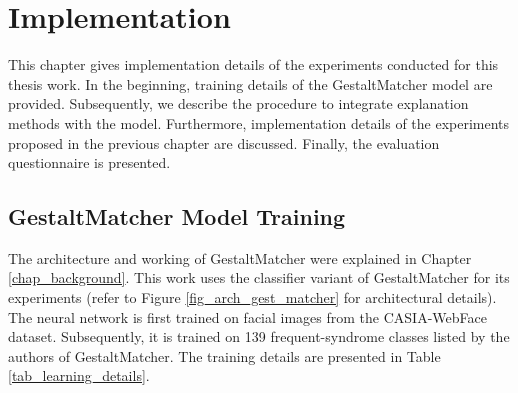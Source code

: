 \documentclass[../report.tex]{subfiles}
\begin{document}
    \chapter{Implementation}\label{ch_implementation}
    \noindent
    This chapter gives implementation details of the experiments conducted for this thesis work. In the beginning,  training details of the GestaltMatcher model are provided. Subsequently, we describe the procedure to integrate explanation methods with the model. Furthermore, implementation details of the experiments proposed in the previous chapter are discussed. Finally, the evaluation questionnaire is presented.
	\section{GestaltMatcher Model Training}
	    \noindent
	The architecture and working of GestaltMatcher were explained in Chapter \ref{chap_background}. This work uses the classifier variant of GestaltMatcher for its experiments (refer to Figure \ref{fig_arch_gest_matcher} for architectural details). The neural network is first trained on facial images from the CASIA-WebFace \cite{yi2014learning} dataset. Subsequently, it is trained on 139 frequent-syndrome classes listed by the authors of GestaltMatcher. The training details are presented in Table \ref{tab_learning_details}.
	
\end{document}
